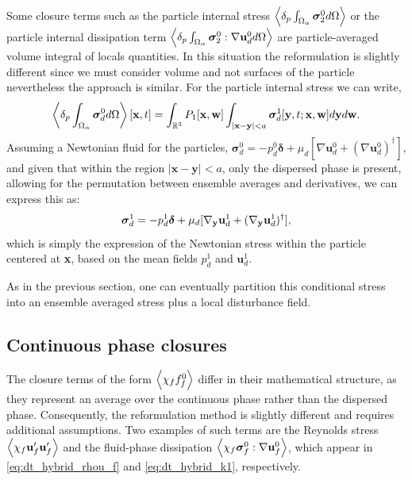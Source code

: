 Some closure terms such as the particle internal stress $\left<\delta_p \int_{\Omega_{\alpha}} \bm{\sigma}_2^0 d\Omega\right>$ or the particle internal dissipation term $\left<\delta_p \int_{\Omega_{\alpha}} \bm{\sigma}_2^0:\mathbf{\nabla} \textbf{u}_d^0 d\Omega\right>$ are particle-averaged volume integral of locals quantities. 
In this situation the reformulation is slightly different since we must consider volume and not surfaces of the particle nevertheless the approach is similar. 
For the particle internal stress we can write, 
\begin{equation}
    \pOavg{\bm\sigma_d^0}[\textbf{x},t]
    =
    \int_{\mathbb{R}^3}
    P_1[\textbf{x},\textbf{w}]
    \int_{|\textbf{x}-\textbf{y}|<a}
    \bm\sigma_d^1[\textbf{y},t;\textbf{x},\textbf{w}] 
    d\textbf{y}
    d\textbf{w}. 
    \label{eq:conditionally_averaged_vol}
\end{equation}
Assuming a Newtonian fluid for the particles, $\bm\sigma_d^0 = -p_d^0 \bm\delta + \mu_d [\nabla \textbf{u}_d^0 + (\nabla \textbf{u}_d^0)^\dagger]$, and given that within the region $|\textbf{x} - \textbf{y}| < a$, only the dispersed phase is present, allowing for the permutation between ensemble averages and derivatives, we can express this as:
\begin{equation}
    \bm\sigma_d^1  
    = 
    -p_d^1   \bm\delta
    + \mu_d  [\pddy \textbf{u}^1_d+(\pddy  \textbf{u}^1_d)^\dagger],
    \label{eq:dispersed_phase_stress}
\end{equation}
which is simply the expression of the Newtonian stress within the particle centered at \textbf{x}, based on the mean fields $p_d^1$ and $\textbf{u}_d^1$. 

As in the previous section, one can eventually partition this conditional stress into an ensemble averaged stress plus a local disturbance field. 

\subsection{Continuous phase closures}

The closure terms of the form $\left<\chi_f f_f^0\right>$ differ in their mathematical structure, as they represent an average over the continuous phase rather than the dispersed phase. 
Consequently, the reformulation method is slightly different and requires additional assumptions. Two examples of such terms are the Reynolds stress $\left<\chi_f \textbf{u}_f'\textbf{u}_f'\right>$ and the fluid-phase dissipation $\left<\chi_f \bm\sigma_f^0 : \nabla \textbf{u}_f^0\right>$, which appear in \ref{eq:dt_hybrid_rhou_f} and \ref{eq:dt_hybrid_k1}, respectively.  

